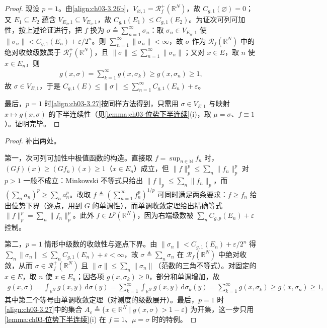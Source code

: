 \documentclass[../../main.tex]{subfiles}%
\begin{document}
\begin{proof}
现设 $p=1$。由\eqref{align:ch03-3.26b}，$V_{\varnothing,1}=\mathscr{R}^+_f(\mathbb{R}^N)$，故 $C_{g,1}(\varnothing)=0$；又 $E_1\subseteq E_2$ 蕴含 $V_{E_2,1}\subseteq V_{E_1,1}$，故 $C_{g,1}(E_1)\leqslant C_{g,1}(E_2)$。为证次可列可加性，按上述论证进行，把 $f$ 换为 $\sigma\triangleq\sum_{n=1}^\infty\sigma_n$：取 $\sigma_n\in V_{E_n,1}$ 使 $\|\sigma_n\|<C_{g,1}(E_n)+\varepsilon/2^n$。则 $\sum_{n=1}^\infty\|\sigma_n\|<\infty$，故 $\sigma$ 作为 $\mathscr{R}_f(\mathbb{R}^N)$ 中的绝对收敛级数属于 $\mathscr{R}^+_f(\mathbb{R}^N)$，且 $\|\sigma\|\leqslant\sum_{n=1}^\infty\|\sigma_n\|$；又对 $x\in E$，取 $n$ 使 $x\in E_n$，则
\begin{align*}
g(x,\sigma)=\sum_{k=1}^\infty g(x,\sigma_k)\geqslant g(x,\sigma_n)\geqslant1,
\end{align*}
故 $\sigma\in V_{E,1}$，于是 $C_{g,1}(E)\leqslant\|\sigma\|\leqslant\sum_{n=1}^\infty C_{g,1}(E_n)+\varepsilon$。

最后，$p=1$ 时\eqref{align:ch03-3.27}按同样方法得到，只需用 $\sigma\in V_{E,1}$ 与映射 $x\mapsto g(x,\sigma)$ 的下半连续性（见\cref{lemma:ch03-位势下半连续}(i)，取 $\mu=\sigma$、$f\equiv1$）。证明完毕。
\end{proof}

\begin{proof}
补出两处。

第一，次可列可加性中极值函数的构造。直接取 $f=\sup_{n\in\mathbb{N}}f_n$ 时，$(Gf)(x)\geqslant(Gf_n)(x)\geqslant1$（$x\in E_n$）成立，但 $\|f\|_p^p\leqslant\sum_n\|f_n\|_p^p$ 对 $p>1$ 一般不成立：Minkowski 不等式只给出 $\|f\|_p\leqslant\sum_n\|f_n\|_p$，而 $\left(\sum_na_n\right)^p\geqslant\sum_na_n^p$。改取 $f\triangleq\left(\sum_{n=1}^\infty f_n^p\right)^{1/p}$ 可同时满足两条要求：$f\geqslant f_n$ 给出位势下界（逐点，用到 $G$ 的单调性），而单调收敛定理给出精确等式 $\|f\|_p^p=\sum_n\|f_n\|_p^p$。此外 $f\in L^p(\mathbb{R}^N)$，因为右端级数被 $\sum_nC_{g,p}(E_n)+\varepsilon$ 控制。

第二，$p=1$ 情形中级数的收敛性与逐点下界。由 $\|\sigma_n\|<C_{g,1}(E_n)+\varepsilon/2^n$ 得 $\sum_n\|\sigma_n\|\leqslant\sum_nC_{g,1}(E_n)+\varepsilon<\infty$，故 $\sigma\triangleq\sum_n\sigma_n$ 在 $\mathscr{R}_f(\mathbb{R}^N)$ 中绝对收敛，从而 $\sigma\in\mathscr{R}^+_f(\mathbb{R}^N)$ 且 $\|\sigma\|\leqslant\sum_n\|\sigma_n\|$（范数的三角不等式）。对固定的 $x\in E$，取 $n$ 使 $x\in E_n$；因各项 $g(x,\sigma_k)\geqslant0$，部分和单调增加，故
\begin{align*}
g(x,\sigma)=\int_{\mathbb{R}^N}g(x,y)\,\mathrm{d}\sigma(y)
=\sum_{k=1}^\infty\int_{\mathbb{R}^N}g(x,y)\,\mathrm{d}\sigma_k(y)
=\sum_{k=1}^\infty g(x,\sigma_k)\geqslant g(x,\sigma_n)\geqslant1,
\end{align*}
其中第二个等号由单调收敛定理（对测度的级数展开）。最后，$p=1$ 时\eqref{align:ch03-3.27}中的集合 $A_\varepsilon\triangleq\{x\in\mathbb{R}^N\mid g(x,\sigma)>1-\varepsilon\}$ 为开集，这一步只用\cref{lemma:ch03-位势下半连续}(i) 在 $f\equiv1$、$\mu=\sigma$ 时的特例。
\end{proof}
\end{document}
